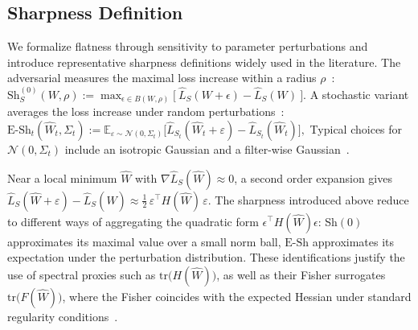 \documentclass{article}
\theoremstyle{plain}
\theoremstyle{definition}
\theoremstyle{remark}
\begin{document}

\subsection{Sharpness Definition}
\label{sec:flatness-subspace}

We formalize flatness through sensitivity to parameter perturbations and introduce representative sharpness definitions widely used in the literature.
The adversarial measures the maximal loss increase within a radius $\rho$~\citep{AWP2020,foretSharpnessAwareMinimizationEfficiently2021}: 
$\mathrm{Sh}^{(0)}_S(W,\rho) :=\max_{{\epsilon}\in B(W,\rho)} \Big[\ \hat{L}_{S}(W+{\epsilon})-\hat{L}_{S}(W)\ \Big].$
A %
stochastic variant averages the loss increase under random perturbations~\citep{liRevisitingRandomWeight2024,jiang2019fantasticgeneralizationmeasures}:
$\mathrm{E\text{-}Sh}_t(\hat{W}_t, \Sigma_t)
 :=
 \mathbb{E}_{\varepsilon \sim \mathcal{N}(0,\Sigma_t)}
 \big[
 \hat{L}_{S_t}(\hat{W}_t+\varepsilon) - \hat{L}_{S_t}(\hat{W}_t)
 \big],$
Typical choices for $\mathcal{N}(0,\Sigma_t)$ include an isotropic Gaussian and a filter-wise Gaussian~\citep{pmlr-v151-bisla22a}. 

Near a local minimum $\hat W$ with $\nabla \hat L_S(\hat W) \approx 0$, a second order expansion gives
$
\hat L_S(\hat W + \varepsilon) - \hat L_S(\hat W)
\approx
\tfrac12\,\varepsilon^\top H(\hat W)\,\varepsilon.
$
The sharpness introduced above reduce to different ways of aggregating the quadratic form $\epsilon^{\top}H(\hat W)\epsilon$: Sh$(0)$ approximates its maximal value over a small norm ball, $\mathrm{E\text{-}Sh}$ approximates its expectation under the perturbation distribution. These identifications justify the use of spectral proxies such as  $\mathrm{tr}\big(H(\hat{W})\big)$, as well as their Fisher surrogates $\mathrm{tr}\big(F(\hat{W})\big)$, where the Fisher coincides with the expected Hessian under standard regularity conditions~\citep{dinhSharpMinimaCan2017,caoTradeoffFlatnessOptimization2024,tsuzukuNormalizedFlatMinima2020,miMakeSharpnessAwareMinimization2022}. 
\end{document}
